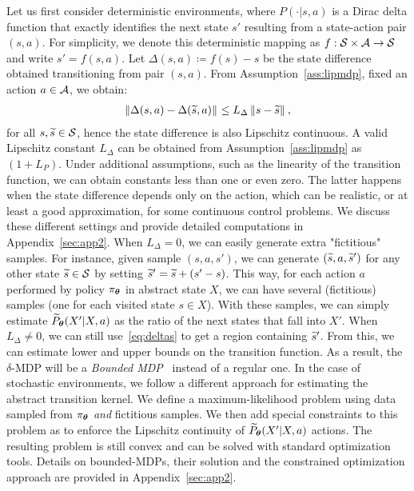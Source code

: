 %
Let us first consider deterministic environments, where $P(\cdot|s, a)$ is a Dirac delta function that exactly identifies the next state $s'$ resulting from a state-action pair $(s,a)$. For simplicity, we denote this deterministic mapping as $f:\mathcal{S}\times\mathcal{A}\to\mathcal{S}$ and write $s'=f(s,a)$.
Let $\Delta(s, a) \coloneqq f(s) - s$ be the state difference obtained transitioning from pair $(s,a)$. From Assumption~\ref{ass:lipmdp}, fixed an action $a\in\mathcal{A}$, we obtain:
%
\begin{align}\label{eq:deltas}
\left\|\Delta (s, a) - \Delta (\widetilde{s}, a)\right\|_{} \leq L_{\Delta}\left\|s - \widetilde{s}\right\|_{},
\end{align}
%
for all $s,\widetilde{s}\in\mathcal{S}$, hence the state difference is also Lipschitz continuous. A valid Lipschitz constant $L_{\Delta}$ can be obtained from Assumption~\ref{ass:lipmdp} as $(1+L_{P})$. Under additional assumptions, such as the linearity of the transition function, we can obtain constants less than one or even zero. The latter happens when the state difference depends only on the action, which can be realistic, or at least a good approximation, for some continuous control problems. We discuss these different settings and provide detailed computations in Appendix~\ref{sec:app2}.
%
When $L_{\Delta}=0$, we can easily generate extra "fictitious" samples. For instance, given sample $(s,a,s')$, we can generate $(\widetilde{s},a,\widetilde{s}')$ for any other state $\widetilde{s}\in\mathcal{S}$ by setting $\widetilde{s}' = \widetilde{s} + (s'-s)$. This way, for each action $a$ performed by policy $\pi_{\boldsymbol{\theta}}$ in abstract state $X$, we can have several (fictitious) samples (one for each visited state $s\in X$). With these samples, we can simply estimate $\widetilde{P}_{\boldsymbol{\theta}}(X'|X,a)$ as the ratio of the next states that fall into $X'$.
When $L_{\Delta}\neq 0$, we can still use~\eqref{eq:deltas} to get a region containing $\widetilde{s}'$.
From this, we can estimate lower and upper bounds on the transition function. As a result, the $\delta$-MDP will be a \textit{Bounded MDP}~\citep{givan2000bounded} instead of a regular one.
%
In the case of stochastic environments, we follow a different approach for estimating the abstract transition kernel. We define a maximum-likelihood problem using data sampled from $\pi_{\boldsymbol{\theta}}$ \textit{and} fictitious samples. We then add special constraints to this problem as to enforce the Lipschitz continuity of $\widetilde{P}_{\boldsymbol{\theta}}(X'|X,a)$ \wrt actions. The resulting problem is still convex and can be solved with standard optimization tools.
Details on bounded-MDPs, their solution and the constrained optimization approach are provided in Appendix~\ref{sec:app2}. 

